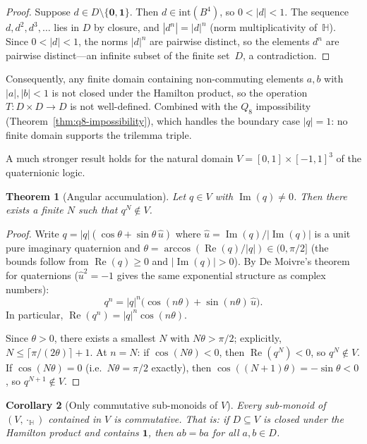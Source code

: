 \documentclass[11pt,a4paper]{article}
\newtheorem{theorem}{Theorem}
\newtheorem{corollary}[theorem]{Corollary}
\newcommand{\Real}{\operatorname{Re}}
\newcommand{\Imag}{\operatorname{Im}}
\newcommand{\Hq}{\mathbb{H}}
\begin{document}
\begin{proof}
Suppose $d \in D \setminus \{\mathbf{0}, \mathbf{1}\}$.
Then $d \in \mathrm{int}(B^4)$, so $0 < |d| < 1$.  The sequence
$d, d^2, d^3, \ldots$ lies in $D$ by closure, and
$|d^n| = |d|^n$ (norm multiplicativity of~$\Hq$). Since
$0 < |d| < 1$, the norms $|d|^n$ are pairwise distinct, so the
elements $d^n$ are pairwise distinct---an infinite subset of the
finite set~$D$, a contradiction.
\end{proof}

Consequently, any finite domain containing non-commuting elements
$a, b$ with $|a|, |b| < 1$ is not closed under the Hamilton product,
so the operation $T \colon D \times D \to D$ is not well-defined.
Combined with the $Q_8$ impossibility
(Theorem~\ref{thm:q8-impossibility}), which handles the boundary
case $|q| = 1$: no finite domain supports the trilemma triple.

A much stronger result holds for the natural domain
$V = [0,1] \times [-1,1]^3$ of the quaternionic logic.

\begin{theorem}[Angular accumulation]
\label{thm:angular}
Let $q \in V$ with $\Imag(q) \neq 0$. Then there exists a finite
$N$ such that $q^N \notin V$.
\end{theorem}

\begin{proof}
Write $q = |q|(\cos\theta + \sin\theta\,\hat{u})$ where
$\hat{u} = \Imag(q)/|\Imag(q)|$ is a unit pure imaginary quaternion
and $\theta = \arccos(\Real(q)/|q|) \in (0, \pi/2]$ (the bounds
follow from $\Real(q) \geq 0$ and $|\Imag(q)| > 0$). By
De Moivre's theorem for quaternions ($\hat{u}^2 = -1$ gives the
same exponential structure as complex numbers):
\[
  q^n = |q|^n\bigl(\cos(n\theta) + \sin(n\theta)\,\hat{u}\bigr).
\]
In particular, $\Real(q^n) = |q|^n \cos(n\theta)$.

Since $\theta > 0$, there exists a smallest $N$ with
$N\theta > \pi/2$; explicitly, $N \leq \lceil\pi/(2\theta)\rceil + 1$.
At $n = N$: if $\cos(N\theta) < 0$, then $\Real(q^N) < 0$, so
$q^N \notin V$. If $\cos(N\theta) = 0$ (i.e.\ $N\theta = \pi/2$
exactly), then $\cos((N{+}1)\theta) = -\sin\theta < 0$, so
$q^{N+1} \notin V$.
\end{proof}

\begin{corollary}[Only commutative sub-monoids of $V$]
\label{cor:commutative-submonoid}
Every sub-monoid of $(V, \cdot_{\Hq})$ contained in $V$ is
commutative. That is: if $D \subseteq V$ is closed under the
Hamilton product and contains $\mathbf{1}$, then $ab = ba$ for all
$a, b \in D$.
\end{corollary}
\end{document}
